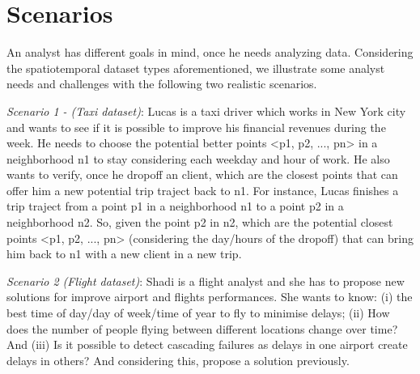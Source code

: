 \section{Scenarios}\label{sec:scenarios}

An analyst has different goals in mind, once he needs analyzing data. Considering the spatiotemporal dataset types aforementioned, we illustrate some analyst needs and challenges with the following two realistic scenarios.

\textit{Scenario 1 - (Taxi dataset)}: Lucas is a taxi driver which works in New York city and wants to see if it is possible to improve his financial revenues during the week. He needs to choose the potential better points <p1, p2, ..., pn> in a neighborhood n1 to stay considering each weekday and hour of work. He also wants to verify, once he dropoff an client, which are the closest points that can offer him a new potential trip traject back to n1. For instance, Lucas finishes a trip traject from a point p1 in a neighborhood n1 to a point p2 in a neighborhood n2.  So, given the point p2 in n2, which are the potential closest points <p1, p2, ..., pn> (considering the day/hours of the dropoff) that can bring him back to n1 with a new client in a new trip.    

\textit{Scenario 2 (Flight dataset)}: Shadi is a flight analyst and she has to propose new solutions for improve airport and flights performances. She wants to know: (i) the best time of day/day of week/time of year to fly to minimise delays; (ii) How does the number of people flying between different locations change over time? And (iii) Is it possible to detect cascading failures as delays in one airport create delays in others? And considering this, propose a solution previously. 
